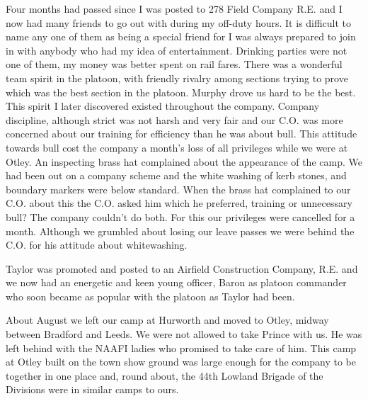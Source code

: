 Four months had passed since I was posted to 278 Field Company
R.E. and I now had many friends to go out with during my off-duty
hours. It is difficult to name any one of them as being a special
friend for I was always prepared to join in with anybody who had my
idea of entertainment. Drinking parties were not one of them, my
money was better spent on rail fares. There was a wonderful team
spirit in the platoon, with friendly rivalry among sections trying to
prove which was the best section in the platoon. \Corporal Murphy
drove us hard to be the best. This spirit I later discovered
existed throughout the company. Company discipline, although strict
was not harsh and very fair and our C.O. was more concerned about our
training for efficiency than he was about bull. This attitude
towards bull cost the company a month's loss of all privileges while
we were at Otley. An inspecting brass hat complained about the
appearance of the camp. We had been out on a company scheme and the
white washing of kerb stones, and boundary markers were below
standard. When the brass hat complained to our C.O. about this
the C.O. asked him which he preferred, training or unnecessary bull?
The company couldn't do both. For this our privileges were cancelled
for a month. Although we grumbled about losing our leave passes we
were behind the C.O. for his attitude about whitewashing.

\Lieutenant Taylor was promoted and posted to an Airfield
Construction Company, R.E. and we now had an energetic and keen
young officer, \lieutenant Baron as platoon commander who soon
became as popular with the platoon as \lieutenant Taylor had been.

About August we left our camp at Hurworth and moved to Otley, midway
between Bradford and Leeds. We were not allowed to take Prince with
us. He was left behind with the NAAFI ladies who promised to take
care of him. This camp at Otley built on the town show ground was
large enough for the company to be together in one place and, round
about, the 44th Lowland Brigade of the Divisions were in similar camps
to ours.

